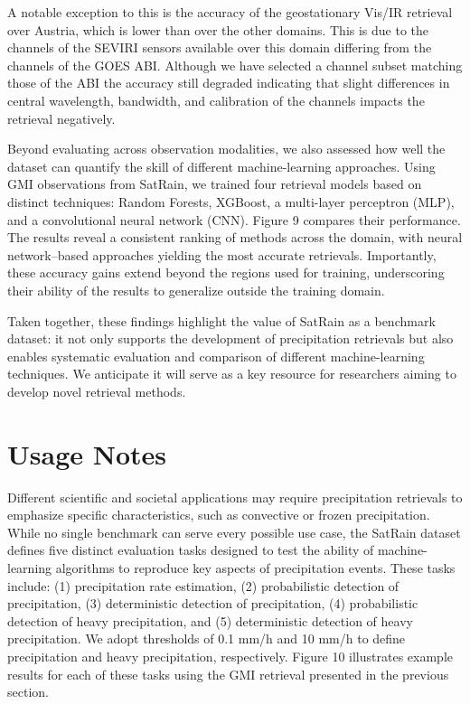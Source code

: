 \documentclass[11pt]{article}
\begin{document}
A notable exception to this is the accuracy of the geostationary Vis/IR
retrieval over Austria, which is lower than over the other domains. This is due
to the channels of the SEVIRI sensors available over this domain differing from
the channels of the GOES ABI. Although we have selected a channel subset
matching those of the ABI the accuracy still degraded indicating that slight
differences in central wavelength, bandwidth, and calibration of the channels
impacts the retrieval negatively.

Beyond evaluating across observation modalities, we also assessed how well the
dataset can quantify the skill of different machine-learning approaches. Using
GMI observations from SatRain, we trained four retrieval models based on
distinct techniques: Random Forests, XGBoost, a multi-layer perceptron (MLP),
and a convolutional neural network (CNN). Figure 9 compares their performance.
The results reveal a consistent ranking of methods across the domain, with
neural network–based approaches yielding the most accurate retrievals.
Importantly, these accuracy gains extend beyond the regions used for training,
underscoring their ability of the results to generalize outside the training
domain.

Taken together, these findings highlight the value of SatRain as a benchmark
dataset: it not only supports the development of precipitation retrievals but
also enables systematic evaluation and comparison of different machine-learning
techniques. We anticipate it will serve as a key resource for researchers aiming
to develop novel retrieval methods.

\section{Usage Notes}

Different scientific and societal applications may require precipitation
retrievals to emphasize specific characteristics, such as convective or frozen
precipitation. While no single benchmark can serve every possible use case, the
SatRain dataset defines five distinct evaluation tasks designed to test the
ability of machine-learning algorithms to reproduce key aspects of precipitation
events. These tasks include: (1) precipitation rate estimation, (2)
probabilistic detection of precipitation, (3) deterministic detection of
precipitation, (4) probabilistic detection of heavy precipitation, and (5)
deterministic detection of heavy precipitation. We adopt thresholds of 0.1 mm/h
and 10 mm/h to define precipitation and heavy precipitation, respectively.
Figure 10 illustrates example results for each of these tasks using the GMI
retrieval presented in the previous section.
\end{document}

